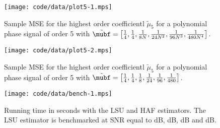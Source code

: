 \documentclass[journal]{IEEEtran}
\begin{document}
\begin{figure}[p] 
   	\centering 
  		\texttt{[image: code/data/plot5-1.mps]} 
  		\caption{Sample MSE for the highest order coefficientl $\tilde{\mu}_5$ for a polynomial phase signal of order 5 with $\tilde{\mubf} = \left[ \tfrac{1}{4}, \tfrac{1}{4}, \tfrac{1}{8N}, \tfrac{1}{24N^2}, \tfrac{1}{96N^3}, \tfrac{1}{480N^4} \right]$.} 
  		\label{plot:m5} 
\end{figure} 

\begin{figure}[p] 
   	\centering 
  		\texttt{[image: code/data/plot5-2.mps]} 
  		\caption{Sample MSE for the highest order coefficientl $\tilde{\mu}_5$ for a polynomial phase signal of order 5 with $\tilde{\mubf} = \left[ \tfrac{1}{4}, \tfrac{1}{4}, \tfrac{1}{8}, \tfrac{1}{24}, \tfrac{1}{96}, \tfrac{1}{480}   \right]$.} 
  		\label{plot:m5} 
\end{figure} 

\begin{figure}[p] 
   	\centering 
  		\texttt{[image: code/data/bench-1.mps]} 
  		\caption{Running time in seconds with the LSU and HAF estimators.  The LSU estimator is benchmarked at SNR equal to \unit[0]{dB}, \unit[5]{dB}, \unit[10]{dB} and \unit[20]{dB}.} 
  		\label{plot:bench} 
\end{figure} 





\end{document}
